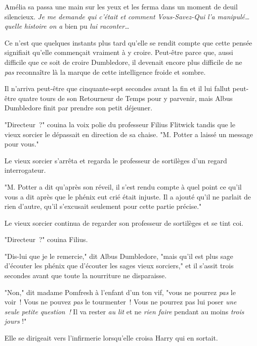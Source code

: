 Amélia sa passa une main sur les yeux et les ferma dans un moment de deuil silencieux. \emph{Je me demande qui c'était et comment Vous-Savez-Qui l'a manipulé… quelle histoire on a} bien pu \emph{lui raconter…}

Ce n'est que quelques instants plus tard qu'elle se rendit compte que cette pensée signifiait qu'elle commençait vraiment à y croire. Peut-être parce que, aussi difficile que ce soit de croire Dumbledore, il devenait encore plus difficile de ne \emph{pas} reconnaître là la marque de cette intelligence froide et sombre.


Il n'arriva peut-être que cinquante-sept secondes avant la fin et il lui fallut peut-être quatre tours de son Retourneur de Temps pour y parvenir, mais Albus Dumbledore finit par prendre son petit déjeuner.

"Directeur~?" couina la voix polie du professeur Filius Flitwick tandis que le vieux sorcier le dépassait en direction de sa chaise. "M. Potter a laissé un message pour vous."

Le vieux sorcier s'arrêta et regarda le professeur de sortilèges d'un regard interrogateur.

"M. Potter a dit qu'après son réveil, il s'est rendu compte à quel point ce qu'il vous a dit après que le phénix eut crié était injuste. Il a ajouté qu'il ne parlait de rien d'autre, qu'il s'excusait seulement pour cette partie précise."

Le vieux sorcier continua de regarder son professeur de sortilèges et se tint coi.

"Directeur~?" couina Filius.

"Dis-lui que je le remercie," dit Albus Dumbledore, "mais qu'il est plus sage d'écouter les phénix que d'écouter les sages vieux sorciers," et il s'assit trois secondes avant que toute la nourriture ne disparaisse.


"Non," dit madame Pomfresh à l'enfant d'un ton vif, "vous ne pourrez \emph{pas} le voir~! Vous ne pouvez \emph{pas} le tourmenter~! Vous ne pourrez pas lui poser \emph{une seule petite question~!} Il va rester \emph{au lit} et ne \emph{rien faire} pendant au moins \emph{trois jours} !"


Elle se dirigeait vers l'infirmerie lorsqu'elle croisa Harry qui en sortait.

